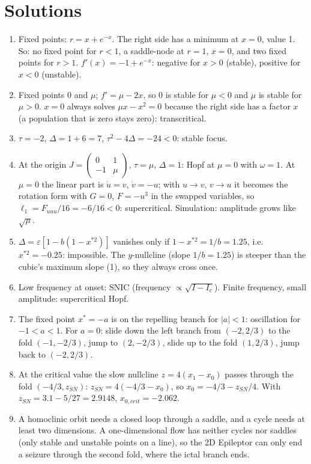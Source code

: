 \documentclass[11pt,openany]{report}
\newcommand{\eps}{\varepsilon}
\begin{document}
\section*{Solutions}
\begin{enumerate}[label=\textbf{\arabic*.}]
\item Fixed points: $r = x + e^{-x}$. The right side has a minimum at $x=0$, value 1. So: no fixed point for $r<1$, a
saddle-node at $r=1$, $x=0$, and two fixed points for $r>1$. $f'(x) = -1 + e^{-x}$: negative for $x>0$ (stable), positive
for $x<0$ (unstable).
\item Fixed points 0 and $\mu$; $f' = \mu - 2x$, so 0 is stable for $\mu<0$ and $\mu$ is stable for $\mu>0$. $x=0$ always
solves $\mu x - x^2 = 0$ because the right side has a factor $x$ (a population that is zero stays zero): transcritical.
\item $\tau = -2$, $\Delta = 1 + 6 = 7$, $\tau^2 - 4\Delta = -24 < 0$: stable focus.
\item At the origin $J = \begin{pmatrix}0&1\\-1&\mu\end{pmatrix}$, $\tau = \mu$, $\Delta = 1$: Hopf at $\mu = 0$ with
$\omega=1$. At $\mu=0$ the linear part is $\dot u = v$, $\dot v = -u$; with $u\to v$, $v\to u$ it becomes the rotation
form with $G = 0$, $F = -u^3$ in the swapped variables, so $\ell_1 = F_{uuu}/16 = -6/16<0$: supercritical. Simulation:
amplitude grows like $\sqrt\mu$.
\item $\Delta = \eps[1 - b(1 - x^{*2})]$ vanishes only if $1 - x^{*2} = 1/b = 1.25$, i.e.\ $x^{*2} = -0.25$: impossible. The
$y$-nullcline (slope $1/b = 1.25$) is steeper than the cubic's maximum slope (1), so they always cross once.
\item Low frequency at onset: SNIC (frequency $\propto\sqrt{I - I_c}$). Finite frequency, small amplitude: supercritical
Hopf.
\item The fixed point $x^* = -a$ is on the repelling branch for $|a|<1$: oscillation for $-1<a<1$. For $a=0$: slide down
the left branch from $(-2, 2/3)$ to the fold $(-1,-2/3)$, jump to $(2,-2/3)$, slide up to the fold $(1, 2/3)$, jump back to
$(-2, 2/3)$.
\item At the critical value the slow nullcline $z = 4(x_1 - x_0)$ passes through the fold $(-4/3, z_{SN})$:
$z_{SN} = 4(-4/3 - x_0)$, so $x_0 = -4/3 - z_{SN}/4$. With $z_{SN} = 3.1 - 5/27 = 2.9148$, $x_{0,crit} = -2.062$.
\item A homoclinic orbit needs a closed loop through a saddle, and a cycle needs at least two dimensions. A
one-dimensional flow has neither cycles nor saddles (only stable and unstable points on a line), so the 2D Epileptor can
only end a seizure through the second fold, where the ictal branch ends.
\end{enumerate}
\end{document}
